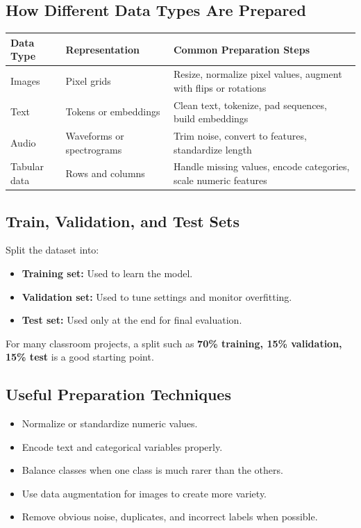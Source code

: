 \documentclass[11pt,a4paper]{article}
\begin{document}
\subsection{How Different Data Types Are Prepared}

\begin{longtable}{@{}p{3cm}p{4cm}p{6.5cm}@{}}
\toprule
\rowcolor{primary!15}
\textbf{Data Type} & \textbf{Representation} & \textbf{Common Preparation Steps} \\
\midrule
\endhead
Images & Pixel grids & Resize, normalize pixel values, augment with flips or rotations \\
\addlinespace
Text & Tokens or embeddings & Clean text, tokenize, pad sequences, build embeddings \\
\addlinespace
Audio & Waveforms or spectrograms & Trim noise, convert to features, standardize length \\
\addlinespace
Tabular data & Rows and columns & Handle missing values, encode categories, scale numeric features \\
\bottomrule
\end{longtable}

\subsection{Train, Validation, and Test Sets}

\begin{definitionbox}
Split the dataset into:
\begin{itemize}[leftmargin=*]
  \item \textbf{Training set:} Used to learn the model.
  \item \textbf{Validation set:} Used to tune settings and monitor overfitting.
  \item \textbf{Test set:} Used only at the end for final evaluation.
\end{itemize}
For many classroom projects, a split such as \textbf{70\% training, 15\% validation, 15\% test} is a good starting point.
\end{definitionbox}

\subsection{Useful Preparation Techniques}

\begin{itemize}[leftmargin=*]
  \item Normalize or standardize numeric values.
  \item Encode text and categorical variables properly.
  \item Balance classes when one class is much rarer than the others.
  \item Use data augmentation for images to create more variety.
  \item Remove obvious noise, duplicates, and incorrect labels when possible.
\end{itemize}
\end{document}
